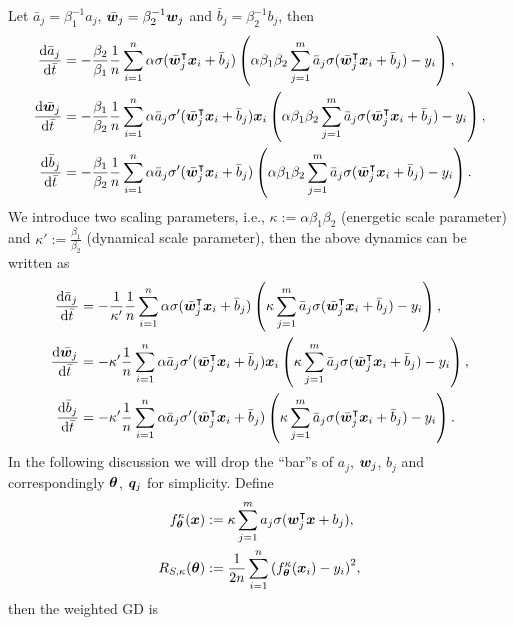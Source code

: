 \documentclass{article}
\begin{document}
Let $\bar{a}_j=\beta_1^{-1}a_j$, $\bar{\bm{w}}_j=\beta_2^{-1}\bm{w}_j$ and $\bar{b}_j=\beta_2^{-1}b_j$, then
\begin{align*}
    \frac{\mathrm{d} \bar{a}_j}{\mathrm{d} \bar{t}}
     & = -\frac{\beta_2}{\beta_1}\frac{1}{n}\sum_{i=1}^n \alpha\sigma(\bar{\bm{w}}_j^\intercal\bm{x}_i+\bar{b}_j) \left(\alpha\beta_1\beta_2\sum_{j=1}^{m}\bar{a}_j\sigma(\bar{\bm{w}}_j^\intercal\bm{x}_i+\bar{b}_j)-y_i\right),               \\
    \frac{\mathrm{d} \bar{\bm{w}}_j}{\mathrm{d} \bar{t}}
     & = -\frac{\beta_1}{\beta_2}\frac{1}{n}\sum_{i=1}^n\alpha\bar{a}_j\sigma'(\bar{\bm{w}}_j^\intercal\bm{x}_i+\bar{b}_j)\bm{x}_i \left(\alpha\beta_1\beta_2\sum_{j=1}^{m}\bar{a}_j\sigma(\bar{\bm{w}}_j^\intercal\bm{x}_i+\bar{b}_j)-y_i\right), \\
    \frac{\mathrm{d} \bar{b}_j}{\mathrm{d} \bar{t}}
     & = -\frac{\beta_1}{\beta_2}\frac{1}{n}\sum_{i=1}^n\alpha\bar{a}_j\sigma'(\bar{\bm{w}}_j^\intercal\bm{x}_i+\bar{b}_j) \left(\alpha\beta_1\beta_2\sum_{j=1}^{m}\bar{a}_j\sigma(\bar{\bm{w}}_j^\intercal\bm{x}_i+\bar{b}_j)-y_i\right).
\end{align*}
We introduce two scaling parameters, i.e., $\kappa:=\alpha\beta_1\beta_2$ (energetic scale parameter) and $\kappa':=\frac{\beta_1}{\beta_2}$ (dynamical scale parameter), then the above dynamics can be written as
\begin{align*}
    \frac{\mathrm{d} \bar{a}_j}{\mathrm{d} \bar{t}}
     & = -\frac{1}{\kappa'}\frac{1}{n}\sum_{i=1}^n \alpha\sigma(\bar{\bm{w}}_j^\intercal\bm{x}_i+\bar{b}_j) \left(\kappa\sum_{j=1}^{m}\bar{a}_j\sigma(\bar{\bm{w}}_j^\intercal\bm{x}_i+\bar{b}_j)-y_i\right),     \\
    \frac{\mathrm{d} \bar{\bm{w}}_j}{\mathrm{d} \bar{t}}
     & = -\kappa'\frac{1}{n}\sum_{i=1}^n\alpha\bar{a}_j\sigma'(\bar{\bm{w}}_j^\intercal\bm{x}_i+\bar{b}_j)\bm{x}_i \left(\kappa\sum_{j=1}^{m}\bar{a}_j\sigma(\bar{\bm{w}}_j^\intercal\bm{x}_i+\bar{b}_j)-y_i\right), \\
    \frac{\mathrm{d} \bar{b}_j}{\mathrm{d} \bar{t}}
     & = -\kappa'\frac{1}{n}\sum_{i=1}^n\alpha\bar{a}_j\sigma'(\bar{\bm{w}}_j^\intercal\bm{x}_i+\bar{b}_j) \left(\kappa\sum_{j=1}^{m}\bar{a}_j\sigma(\bar{\bm{w}}_j^\intercal\bm{x}_i+\bar{b}_j)-y_i\right).
\end{align*}
In the following discussion we will drop the ``bar''s of $a_j$, $\bm{w}_j$, $b_j$ and correspondingly $\bm{\theta}$, $\bm{q}_j$ for simplicity. Define
\begin{align}
    f^{\kappa}_{\bm{\theta}}(\bm{x})
     & := \kappa\sum_{j=1}^{m}a_j\sigma(\bm{w}_j^\intercal\bm{x}+b_j),               \\
    R_{S, \kappa}(\bm{\theta})
     & :=\frac{1}{2n}\sum_{i=1}^n{(f^{\kappa}_{\bm{\theta}}(\bm{x}_i)-y_i)}^2,
\end{align}
then the weighted GD is
\end{document}
